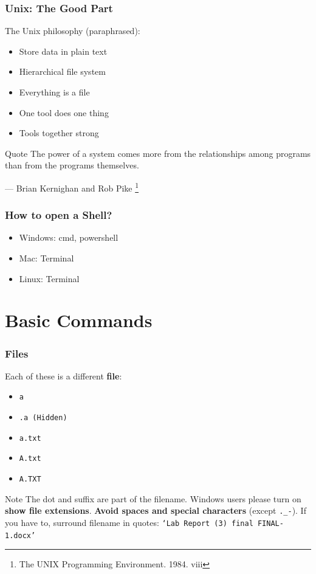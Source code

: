 \documentclass[aspectratio=169]{beamer}
\begin{document}
\begin{frame}
  \frametitle{Unix: The Good Part}
  The Unix philosophy (paraphrased):
  \begin{itemize}
    \item Store data in plain text
    \item Hierarchical file system
    \item Everything is a file
    \item One tool does one thing
    \item Tools together strong
  \end{itemize}
  \begin{block}{Quote}
    The power of a system comes more from the relationships among programs than
    from the programs themselves.
    \begin{flushright}
      — Brian Kernighan and Rob Pike
      \footnote{The UNIX Programming Environment. 1984. viii}
    \end{flushright}
  \end{block}
\end{frame}

\begin{frame}
  \frametitle{How to open a Shell?}
  \begin{itemize}
    \item Windows: cmd, powershell
    \item Mac: Terminal
    \item Linux: Terminal
  \end{itemize}
\end{frame}

\section{Basic Commands}

\begin{frame}[fragile]
  \frametitle{Files}
  Each of these is a different \textbf{file}:
  \begin{itemize}
    \item \tt{a}
    \item \tt{.a} (Hidden)
    \item \tt{a.txt}
    \item \tt{A.txt}
    \item \tt{A.TXT}
  \end{itemize}

  \begin{block}{Note}
    The dot and suffix are part of the filename. Windows users please turn on \textbf{show file extensions}.
    \newline \newline
    \textbf{Avoid spaces and special characters} (except \verb|._-|).
    If you have to, surround filename in quotes:
    \tt{`Lab Report (3) final FINAL-1.docx'}
  \end{block}
\end{frame}
\end{document}
